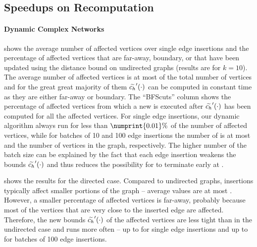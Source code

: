 \subsection{Speedups on Recomputation}
\label{sec:dyn-topk:speedps-rec}
%
\paragraph{Dynamic Complex Networks}
%
 shows the average number of affected
vertices over single edge insertions and the percentage of affected vertices that
are far-away, boundary, or that have been updated using the distance bound
on undirected graphs (results are for $k = 10$).
The average number of affected vertices is at most \maxAffectedPercUndir
of the total number of vertices and for the great
great majority of them $\widetilde{c_h}'(\cdot)$ can be computed in constant time as they are
either far-away or boundary.
The \enquote{BFScuts} column shows the percentage of
affected vertices from which a new \bfscut is executed after $\widetilde{c_h}'(\cdot)$ has
been computed for all the affected vertices.
For single edge insertions, our dynamic algorithm always run \bfscut
for less than $\numprint{0.01}\%$ of the number of affected vertices,
while for batches of 10 and 100 edge insertions the number of \bfscut is at most
\maxBFScutsPercUndirBTen and \maxBFScutsPercUndirBHundred the number of vertices
in the graph, respectively.
%
The higher number of \bfscut the batch size can be explained
by the fact that each edge insertion weakens the bounds $\widetilde{c_h}'(\cdot)$ and thus
reduces the possibility for  to terminate early at
.

 shows the results for the directed case.
Compared to undirected graphs, insertions typically affect smaller portions of
the graph -- average values are at most \maxAffectedPercDir. However, a smaller
percentage of affected vertices is far-away, probably because most of the
vertices that are very close to the inserted edge are affected. Therefore, the
new bounds $\widetilde{c_h}'(\cdot)$ of the affected vertices are less tight than in the
undirected case and  runs \bfscut more often -- up to
\maxBFScutsPercDirBOne for single edge insertions and up to
\maxBFScutsPercDirBHundred for batches of 100 edge insertions.

